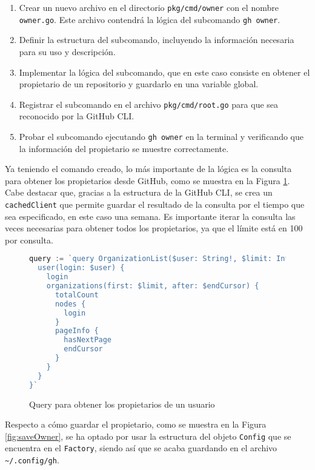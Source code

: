 \begin{enumerate}
  \item Crear un nuevo archivo en el directorio \texttt{pkg/cmd/owner} con el nombre \texttt{owner.go}. Este archivo contendrá la lógica del subcomando \texttt{gh owner}.
  \item Definir la estructura del subcomando, incluyendo la información necesaria para su uso y descripción.
  \item Implementar la lógica del subcomando, que en este caso consiste en obtener el propietario de un repositorio y guardarlo en una variable global.
  \item Registrar el subcomando en el archivo \texttt{pkg/cmd/root.go} para que sea reconocido por la GitHub CLI.
  \item Probar el subcomando ejecutando \texttt{gh owner} en la terminal y verificando que la información del propietario se muestre correctamente.
\end{enumerate}

Ya teniendo el comando creado, lo más importante de la lógica es la consulta para obtener los propietarios desde GitHub, como se muestra en la Figura \ref{fig:queryOwners}. Cabe destacar que, gracias a la estructura de la GitHub CLI, se crea un \texttt{cachedClient} que permite guardar el resultado de la consulta por el tiempo que sea especificado, en este caso una semana. Es importante iterar la consulta las veces necesarias para obtener todos los propietarios, ya que el límite está en 100 por consulta.

\begin{figure}[H]
  \begin{lstlisting}[language=GO]
query := `query OrganizationList($user: String!, $limit: Int!, $endCursor: String) {
  user(login: $user) {
    login
    organizations(first: $limit, after: $endCursor) {
      totalCount
      nodes {
        login
      }
      pageInfo {
        hasNextPage
        endCursor
      }
    }
  }
}`
  \end{lstlisting}
  \caption{Query para obtener los propietarios de un usuario}
  \label{fig:queryOwners}
\end{figure}

Respecto a cómo guardar el propietario, como se muestra en la Figura \ref{fig:saveOwner}, se ha optado por usar la estructura del objeto \texttt{Config} que se encuentra en el \texttt{Factory}, siendo así que se acaba guardando en el archivo \texttt{\textasciitilde/.config/gh}.

